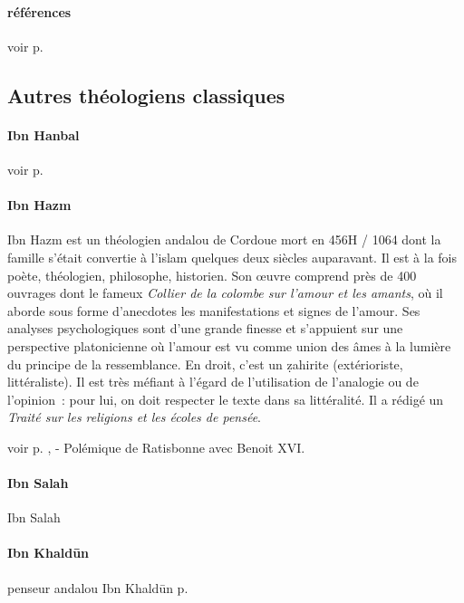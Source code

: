 \paragraph{références}
voir p. 


\subsection{Autres théologiens classiques}

\paragraph{Ibn Hanbal}

voir p. \pageref{Theol:IbnHanbal1}


 \paragraph{Ibn Hazm} \label{Theol:IbnHazm}{Ibn Hazm est un théologien andalou de Cordoue mort en 456H / 1064 dont
la famille s'était convertie à l'islam quelques deux siècles auparavant.
Il est à la fois poète, théologien, philosophe, historien. Son œuvre
comprend près de 400 ouvrages dont le fameux \emph{Collier de la colombe
sur l'amour et les amants}, où il aborde sous forme d'anecdotes les
manifestations et signes de l'amour. Ses analyses psychologiques sont
d'une grande finesse et s'appuient sur une perspective platonicienne où
l'amour est vu comme union des âmes à la lumière du principe de la
ressemblance. En droit, c'est un ẓahirite (extérioriste, littéraliste).
Il est très méfiant à l'égard de l'utilisation de l'analogie ou de
l'opinion~: pour lui, on doit respecter le texte dans sa littéralité. Il
a rédigé un \emph{Traité sur les religions et les écoles de pensée}. }

voir p. \pageref{Theol:IbnHazm1}, \pageref{Theol:IbnHazm2} - Polémique de Ratisbonne avec Benoit XVI.
\paragraph{Ibn Salah}
Ibn Salah
\pageref{Ibnsalah1}
\paragraph{Ibn Khaldūn} penseur andalou Ibn Khaldūn p. \pageref{theol:IbnKhaldun} 
